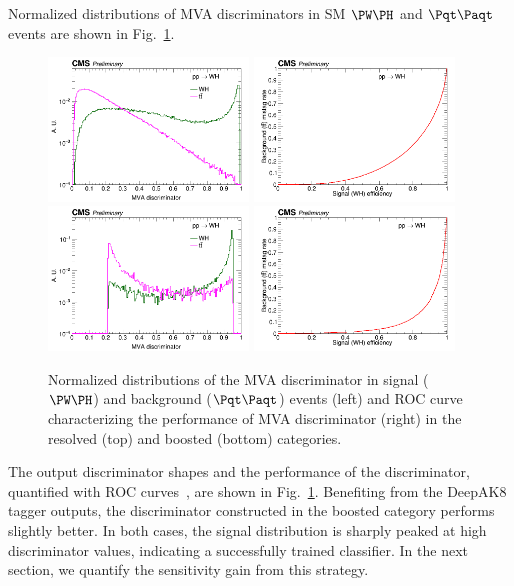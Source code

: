 \documentclass[a4paper,11pt]{article}
\newcommand{\Pt}{{{\Pqt}}\xspace}
\newcommand{\PAt}{{{{\Paqt}}}\xspace}
\begin{document}
Normalized distributions of MVA discriminators in SM $\PW\PH$ and $\Pt\PAt$ events are shown in Fig.~\ref{fig:MVA}. 
\begin{figure}[hbtp]
\begin{center}
\includegraphics[width=0.475\textwidth]{Figures/RECO/Plot_WH_MVA_WH_fast_resolved.png}
\includegraphics[width=0.475\textwidth]{Figures/RECO/ROC_plot_TT_MVA_resolved.png}
\includegraphics[width=0.475\textwidth]{Figures/RECO/Plot_WH_MVA_WH_fast_boosted.png}
\includegraphics[width=0.475\textwidth]{Figures/RECO/ROC_plot_TT_MVA_boosted.png}
\end{center}
\caption{
Normalized distributions of the MVA discriminator in signal ($\PW\PH$) and background ($\Pt\PAt$) events (left) and ROC curve characterizing the performance of MVA discriminator (right) in the resolved (top) and boosted (bottom) categories.
}
\label{fig:MVA}
\end{figure}
The output discriminator shapes and the performance of the discriminator, quantified with ROC curves~\cite{FAWCETT2006861}, are shown in Fig.~\ref{fig:MVA}. 
Benefiting from the DeepAK8 tagger outputs, the discriminator constructed in the boosted category performs slightly better. In both cases, the signal distribution is sharply peaked at high discriminator values, indicating a successfully trained classifier.
In the next section, we quantify the sensitivity gain from this strategy.
\end{document}
